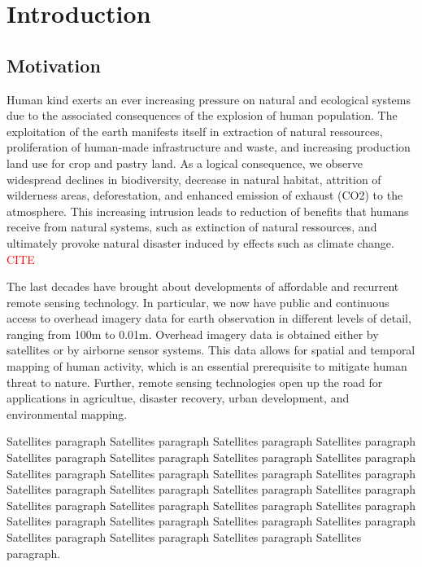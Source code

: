 
\chapter{Introduction}

\label{Chapter1}


\section{Motivation}
Human kind exerts an ever increasing pressure on natural and ecological systems due to the associated consequences of the explosion of human population. The exploitation of the earth manifests itself in extraction of natural ressources, proliferation of human-made infrastructure and waste, and increasing production land use for crop and pastry land. As a logical consequence, we observe widespread declines in biodiversity, 
decrease in natural habitat, attrition of wilderness areas, deforestation, and enhanced emission of exhaust (CO2) to the atmosphere. This increasing intrusion leads to reduction of benefits that humans receive from natural systems, such as extinction of natural ressources, and ultimately provoke natural disaster induced by effects such as climate change. \textcolor{red}{CITE}

The last decades have brought about developments of affordable and recurrent remote sensing technology. In particular, we now have public and continuous access to overhead imagery data for earth observation in different levels of detail, ranging from 100m to 0.01m. Overhead imagery data is obtained either by satellites or by airborne sensor systems. This data allows for spatial and temporal mapping of human activity, which is an essential prerequisite to mitigate human threat to nature. Further, remote sensing technologies open up the road for applications in agricultue, disaster recovery, urban development, and environmental mapping.

Satellites paragraph Satellites paragraph Satellites paragraph Satellites paragraph Satellites paragraph Satellites paragraph Satellites paragraph Satellites paragraph Satellites paragraph Satellites paragraph Satellites paragraph Satellites paragraph Satellites paragraph Satellites paragraph Satellites paragraph Satellites paragraph Satellites paragraph Satellites paragraph Satellites paragraph Satellites paragraph Satellites paragraph Satellites paragraph Satellites paragraph Satellites paragraph Satellites paragraph Satellites paragraph Satellites paragraph Satellites paragraph.

